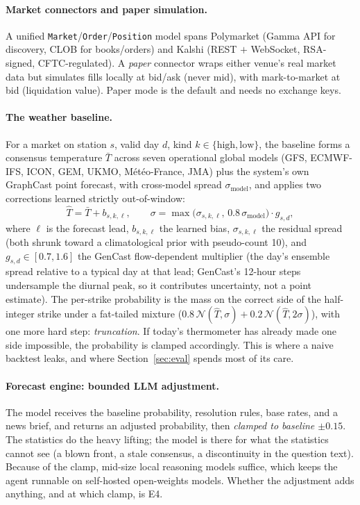 \documentclass[sigconf,review,anonymous]{acmart}
\begin{document}
\paragraph{Market connectors and paper simulation.}
A unified \texttt{Market}/\texttt{Order}/\texttt{Position} model spans Polymarket
(Gamma API for discovery, CLOB for books/orders) and Kalshi (REST $+$ WebSocket,
RSA-signed, CFTC-regulated). A \emph{paper} connector wraps either venue's real
market data but simulates fills locally at bid/ask (never mid), with
mark-to-market at bid (liquidation value). Paper mode is the default and needs
no exchange keys.

\paragraph{The weather baseline.}
For a market on station $s$, valid day $d$, kind $k\in\{\text{high},\text{low}\}$,
the baseline forms a consensus temperature $\bar{T}$ across seven operational
global models (GFS, ECMWF-IFS, ICON, GEM, UKMO, M\'et\'eo-France, JMA) plus the
system's own GraphCast point forecast, with cross-model spread
$\sigma_{\text{model}}$, and applies two corrections learned strictly
out-of-window:
\[
\hat{T} = \bar{T} + b_{s,k,\ell}, \qquad
\sigma = \max\!\big(\sigma_{s,k,\ell},\, 0.8\,\sigma_{\text{model}}\big)\cdot g_{s,d},
\]
where $\ell$ is the forecast lead, $b_{s,k,\ell}$ the learned bias,
$\sigma_{s,k,\ell}$ the residual spread (both shrunk toward a climatological
prior with pseudo-count 10), and $g_{s,d}\in[0.7,1.6]$ the GenCast
flow-dependent multiplier (the day's ensemble spread relative to a typical day
at that lead; GenCast's 12-hour steps undersample the diurnal peak, so it
contributes uncertainty, not a point estimate). The per-strike probability is
the mass on the correct side of the half-integer strike under a fat-tailed
mixture ($0.8\,\mathcal{N}(\hat T,\sigma) + 0.2\,\mathcal{N}(\hat T,2\sigma)$),
with one more hard step: \emph{truncation}. If today's thermometer has already
made one side impossible, the probability is clamped accordingly. This is where
a naive backtest leaks, and where Section~\ref{sec:eval} spends most of its
care.

\paragraph{Forecast engine: bounded LLM adjustment.}
The model receives the baseline probability, resolution rules, base rates, and a
news brief, and returns an adjusted probability, then \emph{clamped to baseline
$\pm 0.15$}. The statistics do the heavy lifting; the model is there for what the
statistics cannot see (a blown front, a stale consensus, a discontinuity in the
question text). Because of the clamp, mid-size local reasoning models suffice,
which keeps the agent runnable on self-hosted open-weights models. Whether the
adjustment adds anything, and at which clamp, is E4.
\end{document}
